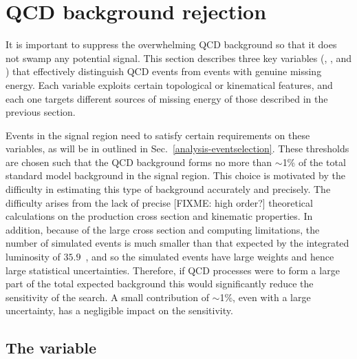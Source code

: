 \section{QCD background rejection}
\label{sec:analysis-qcdrejection}

It is important to suppress the overwhelming QCD background so that it does not 
swamp any potential signal. This section describes three key variables 
(\alphat, \bdphi, and \mhtmet) that effectively distinguish QCD events from 
events with genuine missing energy. Each variable exploits certain topological 
or kinematical features, and each one targets different sources of missing 
energy of those described in the previous section.

Events in the signal region need to satisfy certain requirements on these 
variables, as will be in outlined in Sec.~\ref{analysis-eventselection}. These 
thresholds are chosen such that the QCD background forms no more than $\sim$1\% 
of the total standard model background in the signal region. This choice is 
motivated by the difficulty in estimating this type of background accurately 
and precisely. The difficulty arises from the lack of precise [FIXME: high 
order?] theoretical calculations on the production cross section and kinematic 
properties. 
In addition, because of the large cross section and computing limitations, the 
number of simulated events is much smaller than that expected by the integrated 
luminosity of $35.9$~\ifb, and so the simulated events have large weights and 
hence large statistical uncertainties.
Therefore, if QCD processes were to form a large part of the total expected 
background this would significantly reduce the sensitivity of the search. A 
small contribution of $\sim$1\%, even with a large uncertainty, has a 
negligible impact on the sensitivity.


\subsection{The \alphat variable}

